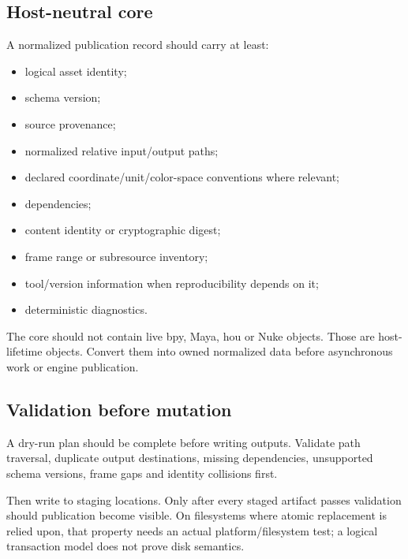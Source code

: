 \subsection{Host-neutral core}\label{appendix-03ade9e1875f-host-neutral-core}

\hypertarget{appendix-03ade9e1875f-host-neutral-core}{}

A normalized publication record should carry at least:

\begin{itemize}
\tightlist
\item
  logical asset identity;
\item
  schema version;
\item
  source provenance;
\item
  normalized relative input/output paths;
\item
  declared coordinate/unit/color-space conventions where relevant;
\item
  dependencies;
\item
  content identity or cryptographic digest;
\item
  frame range or subresource inventory;
\item
  tool/version information when reproducibility depends on it;
\item
  deterministic diagnostics.
\end{itemize}

The core should not contain live bpy, Maya, hou or Nuke objects. Those are host-lifetime objects. Convert them into owned normalized data before asynchronous work or engine publication.

\subsection{Validation before mutation}\label{appendix-03ade9e1875f-validation-before-mutation}

\hypertarget{appendix-03ade9e1875f-validation-before-mutation}{}

A dry-run plan should be complete before writing outputs. Validate path traversal, duplicate output destinations, missing dependencies, unsupported schema versions, frame gaps and identity collisions first.

Then write to staging locations. Only after every staged artifact passes validation should publication become visible. On filesystems where atomic replacement is relied upon, that property needs an actual platform/filesystem test; a logical transaction model does not prove disk semantics.

